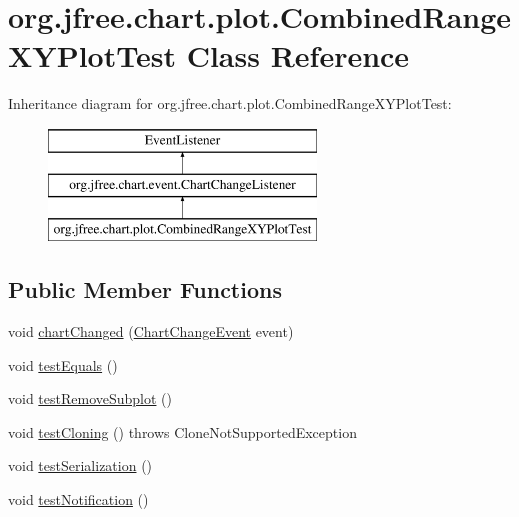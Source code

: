 \hypertarget{classorg_1_1jfree_1_1chart_1_1plot_1_1_combined_range_x_y_plot_test}{}\section{org.\+jfree.\+chart.\+plot.\+Combined\+Range\+X\+Y\+Plot\+Test Class Reference}
\label{classorg_1_1jfree_1_1chart_1_1plot_1_1_combined_range_x_y_plot_test}
Inheritance diagram for org.\+jfree.\+chart.\+plot.\+Combined\+Range\+X\+Y\+Plot\+Test\+:\begin{figure}[H]
\begin{center}
\leavevmode
\includegraphics[height=3.000000cm]{classorg_1_1jfree_1_1chart_1_1plot_1_1_combined_range_x_y_plot_test}
\end{center}
\end{figure}
\subsection*{Public Member Functions}
\begin{DoxyCompactItemize}
\item 
void \mbox{\hyperlink{classorg_1_1jfree_1_1chart_1_1plot_1_1_combined_range_x_y_plot_test_a045ab62222d4078e53b34751458e27de}{chart\+Changed}} (\mbox{\hyperlink{classorg_1_1jfree_1_1chart_1_1event_1_1_chart_change_event}{Chart\+Change\+Event}} event)
\item 
void \mbox{\hyperlink{classorg_1_1jfree_1_1chart_1_1plot_1_1_combined_range_x_y_plot_test_a12efc96752cf723de583402f87c0f52a}{test\+Equals}} ()
\item 
void \mbox{\hyperlink{classorg_1_1jfree_1_1chart_1_1plot_1_1_combined_range_x_y_plot_test_af9bcc26a57f13788c5c6ae8b7765a771}{test\+Remove\+Subplot}} ()
\item 
void \mbox{\hyperlink{classorg_1_1jfree_1_1chart_1_1plot_1_1_combined_range_x_y_plot_test_aa76c015a1239f0c15241ff390317cf7f}{test\+Cloning}} ()  throws Clone\+Not\+Supported\+Exception 
\item 
void \mbox{\hyperlink{classorg_1_1jfree_1_1chart_1_1plot_1_1_combined_range_x_y_plot_test_a042ebe184e02c6ed021d931fe9dcca08}{test\+Serialization}} ()
\item 
void \mbox{\hyperlink{classorg_1_1jfree_1_1chart_1_1plot_1_1_combined_range_x_y_plot_test_adcb57f52ef9c248ee5397c33afc4434d}{test\+Notification}} ()
\end{DoxyCompactItemize}


